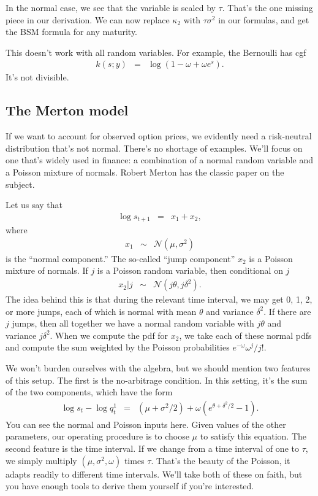 \documentclass[11pt]{article}
\begin{document}
In the normal case, we see that the variable is scaled by $\tau$.
That's the one missing piece in our derivation.
We can now replace $\kappa_2$ with $\tau \sigma^2$ in our formulas,
and get the BSM formula for any maturity.

This doesn't work with all random variables.
For example, the Bernoulli has cgf
\begin{eqnarray*}
    k(s; y) &=& \log \left( 1-\omega + \omega e^s \right) .
\end{eqnarray*}
It's not divisible.


\subsection*{The Merton model}

If we want to account for observed option prices,
we evidently need a risk-neutral distribution that's not normal.
There's no shortage of examples.
We'll focus on one that's widely used in finance:
a combination of a normal random variable and a Poisson mixture of normals.
Robert Merton has the classic paper on the subject.

Let us say that
\begin{eqnarray*}
    \log s_{t+1} &=& x_1 + x_2 ,
\end{eqnarray*}
where
\begin{eqnarray*}
    x_1 &\sim& \mathcal{N}(\mu, \sigma^2)
\end{eqnarray*}
is the ``normal component.''
The so-called ``jump component'' $x_2$ is a Poisson mixture of normals.
If $j$ is a Poisson random variable, then conditional on $j$
\begin{eqnarray*}
    x_2 | j &\sim& \mathcal{N}(j\theta, j\delta^2) .
\end{eqnarray*}
The idea behind this is that during the relevant time interval,
we may get 0, 1, 2, or more jumps, each of which is normal
with mean $\theta$ and variance $\delta^2$.
If there are $j$ jumps, then all together we have
a normal random variable with $j\theta$ and variance $j\delta^2$.
When we compute the pdf for $x_2$,
we take each of these normal pdfs and compute the sum weighted
by the Poisson probabilities $e^{-\omega} \omega^j / j!$.


We won't burden ourselves with the algebra,
but we should mention two features of this setup.
The first is the no-arbitrage condition.
In this setting, it's the sum of the two components,
which have the form
\begin{eqnarray*}
    \log s_t - \log q^1_t &=& (\mu + \sigma^2/2 )
            + \omega \left( e^{\theta+\delta^2/2} - 1 \right) .
\end{eqnarray*}
You can see the normal and Poisson inputs here.
Given values of the other parameters, our operating procedure is
to choose $\mu$ to satisfy this equation.
The second feature is the time interval.
If we change from a time interval of one to $\tau$, we simply multiply
$(\mu, \sigma^2, \omega)$ times $\tau$.
That's the beauty of the Poisson, it adapts readily to different time intervals.
We'll take both of these on faith, but you have enough tools
to derive them yourself if you're interested.
\end{document}

